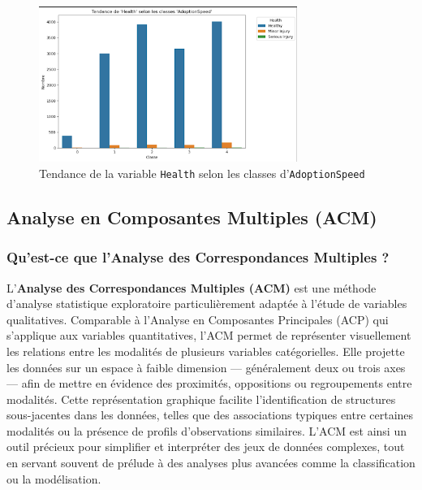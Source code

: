 \documentclass[a4paper,12pt]{article}
\begin{document}
\begin{figure}[H]
    \centering
    \includegraphics[width=0.75\textwidth]{health_adoption_trend.png}
    \caption{Tendance de la variable \texttt{Health} selon les classes d'\texttt{AdoptionSpeed}}
    \label{fig:health_trend}
\end{figure}

\subsection{Analyse en Composantes Multiples (ACM)}

\subsubsection{Qu’est-ce que l’Analyse des Correspondances Multiples ?}
 
L’\textbf{Analyse des Correspondances Multiples (ACM)} est une méthode d’analyse statistique exploratoire particulièrement adaptée à l’étude de variables qualitatives. Comparable à l’Analyse en Composantes Principales (ACP) qui s’applique aux variables quantitatives, l’ACM permet de représenter visuellement les relations entre les modalités de plusieurs variables catégorielles. Elle projette les données sur un espace à faible dimension — généralement deux ou trois axes — afin de mettre en évidence des proximités, oppositions ou regroupements entre modalités. Cette représentation graphique facilite l’identification de structures sous-jacentes dans les données, telles que des associations typiques entre certaines modalités ou la présence de profils d’observations similaires. L’ACM est ainsi un outil précieux pour simplifier et interpréter des jeux de données complexes, tout en servant souvent de prélude à des analyses plus avancées comme la classification ou la modélisation.
 
\end{document}
